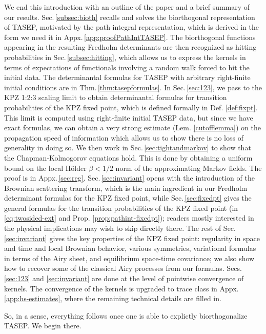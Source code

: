 \documentclass[letterpaper,reqno,11pt,oneside,final]{amsart}
\theoremstyle{definition}
\numberwithin{equation}{section}
\begin{document}
\smallskip
We end this introduction with an outline of the paper and a brief summary of our results.
Sec.\,\ref{subsec:bioth} recalls and solves the biorthogonal representation of TASEP, motivated by the path integral representation, which is derived in the form we need it in Appx.\,\ref{app:proofPathIntTASEP}.
The biorthogonal functions appearing in the resulting Fredholm determinants are then recognized as hitting probabilities in Sec.\,\ref{subsec:hitting}, which allows us to express the kernels in terms of expectations of functionals involving a random walk forced to hit the initial data.
The determinantal formulas for TASEP with arbitrary right-finite initial conditions are in Thm.\,\ref{thm:tasepformulas}.  
In Sec.\,\ref{sec:123}, we pass to the KPZ 1:2:3 scaling limit to obtain determinantal formulas for transition probabilities of the KPZ fixed point, which is defined formally in Def. \ref{def:fixpt}.
This limit is computed using right-finite initial TASEP data, but since we have exact formulas, we can obtain  a very strong estimate (Lem. \ref{cutofflemma}) on the propagation speed of information which allows us to show there is no loss of generality in doing so.
We then work in Sec.\,\ref{sec:tightandmarkov} to show that the Chapman-Kolmogorov equations hold.
This is done by obtaining a uniform bound on the local H\"older $\beta<1/2$ norm of the approximating Markov fields.
The proof is in Appx.\,\ref{sec:reg}. 
Sec.\,\ref{sec:invariant} opens with the introduction of the Brownian scattering transform, which is the main ingredient in our Fredholm determinant formulas for the KPZ fixed point, while Sec.\,\ref{sec:fixedpt} gives
the general formulas for the transition probabilities of the KPZ fixed point (in \eqref{eq:twosided-ext} and Prop. \ref{prop:pathint-fixedpt}); readers mostly interested in the physical implications may wish to skip directly there.   
The rest of Sec.\,\ref{sec:invariant} gives the key properties of the KPZ fixed point: regularity in space and time and local Brownian behavior, various symmetries, variational formulas in terms of the Airy sheet, and equilibrium space-time covariance; we also show how to recover some of the classical Airy processes from our formulas.
Secs.\,\ref{sec:123} and \ref{sec:invariant} are done at the level of pointwise convergence of kernels.
The convergence of the kernels is upgraded to trace class in Appx.\,\ref{app:hs-estimates}, where the remaining technical details are filled in.

\smallskip
So, in a  sense, everything follows once one is able to explictly biorthogonalize TASEP.
We begin there.
\end{document}
